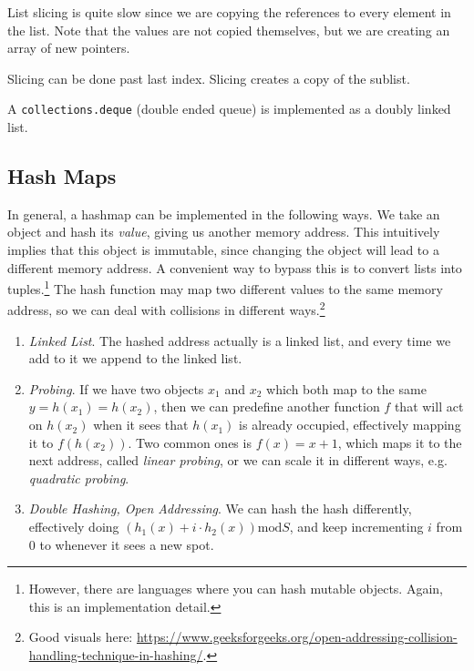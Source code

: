   \begin{definition}[Extend]
    \label{def:extend}
    
  \end{definition}

  \begin{definition}[Sort]
    \label{def:sort}
    
  \end{definition}

  List slicing is quite slow since we are copying the references to every element in the list. Note that the values are not copied themselves, but we are creating an array of new pointers. 

  Slicing can be done past last index. Slicing creates a copy of the sublist. 

  \begin{definition}[Queues]
    \label{def:queues}
    A \texttt{collections.deque} (double ended queue) is implemented as a doubly linked list. 
  \end{definition}

\subsection{Hash Maps}

  In general, a hashmap can be implemented in the following ways. We take an object and hash its \textit{value}, giving us another memory address. This intuitively implies that this object is immutable, since changing the object will lead to a different memory address. A convenient way to bypass this is to convert lists into tuples.\footnote{However, there are languages where you can hash mutable objects. Again, this is an implementation detail.} The hash function may map two different values to the same memory address, so we can deal with collisions in different ways.\footnote{Good visuals here: \href{https://www.geeksforgeeks.org/open-addressing-collision-handling-technique-in-hashing/}{https://www.geeksforgeeks.org/open-addressing-collision-handling-technique-in-hashing/}.}

  \begin{enumerate}
    \item \textit{Linked List}. The hashed address actually is a linked list, and every time we add to it we append to the linked list. 
    \item \textit{Probing}. If we have two objects $x_1$ and $x_2$ which both map to the same $y = h(x_1) = h(x_2)$, then we can predefine another function $f$ that will act on $h(x_2)$ when it sees that $h(x_1)$ is already occupied, effectively mapping it to $f(h(x_2))$. Two common ones is $f(x) = x + 1$, which maps it to the next address, called \textit{linear probing}, or we can scale it in different ways, e.g. \textit{quadratic probing}. 
    \item \textit{Double Hashing, Open Addressing}. We can hash the hash differently, effectively doing $(h_1(x) + i \cdot h_2(x)) \mathrm{mod} S$, and keep incrementing $i$ from $0$ to whenever it sees a new spot. 
  \end{enumerate}

